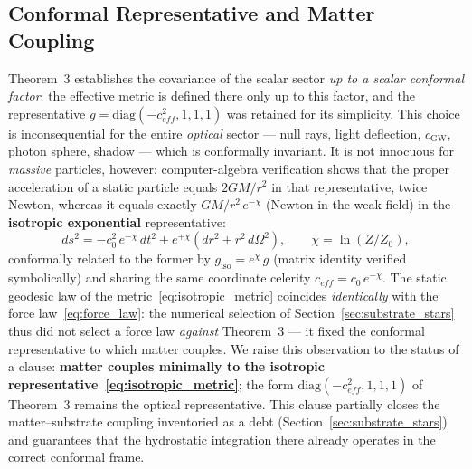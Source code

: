 \documentclass[11pt,a4paper]{article}
\theoremstyle{plain}
\theoremstyle{remark}
\begin{document}
\subsection{Conformal Representative and Matter Coupling}
\label{sec:conformal_representative}
Theorem~3 establishes the covariance of the scalar sector \emph{up to a scalar conformal factor}: the effective metric is defined there only up to this factor, and the representative $g = \mathrm{diag}(-c_{eff}^2, 1, 1, 1)$ was retained for its simplicity. This choice is inconsequential for the entire \emph{optical} sector --- null rays, light deflection, $c_{\text{GW}}$, photon sphere, shadow --- which is conformally invariant. It is not innocuous for \emph{massive} particles, however: computer-algebra verification shows that the proper acceleration of a static particle equals $2GM/r^2$ in that representative, twice Newton, whereas it equals exactly $GM/r^2\,e^{-\chi}$ (Newton in the weak field) in the \textbf{isotropic exponential} representative:
\begin{equation}\label{eq:isotropic_metric}
ds^2 = -c_0^2\,e^{-\chi}\,dt^2 + e^{+\chi}\left(dr^2 + r^2\,d\Omega^2\right), \qquad \chi = \ln(Z/Z_0),
\end{equation}
conformally related to the former by $g_{\text{iso}} = e^{\chi}\,g$ (matrix identity verified symbolically) and sharing the same coordinate celerity $c_{eff} = c_0\,e^{-\chi}$. The static geodesic law of the metric~\eqref{eq:isotropic_metric} coincides \emph{identically} with the force law~\eqref{eq:force_law}: the numerical selection of Section~\ref{sec:substrate_stars} thus did not select a force law \emph{against} Theorem~3 --- it fixed the conformal representative to which matter couples. We raise this observation to the status of a clause: \textbf{matter couples minimally to the isotropic representative~\eqref{eq:isotropic_metric}}; the form $\mathrm{diag}(-c_{eff}^2,1,1,1)$ of Theorem~3 remains the optical representative. This clause partially closes the matter--substrate coupling inventoried as a debt (Section~\ref{sec:substrate_stars}) and guarantees that the hydrostatic integration there already operates in the correct conformal frame.
\end{document}
